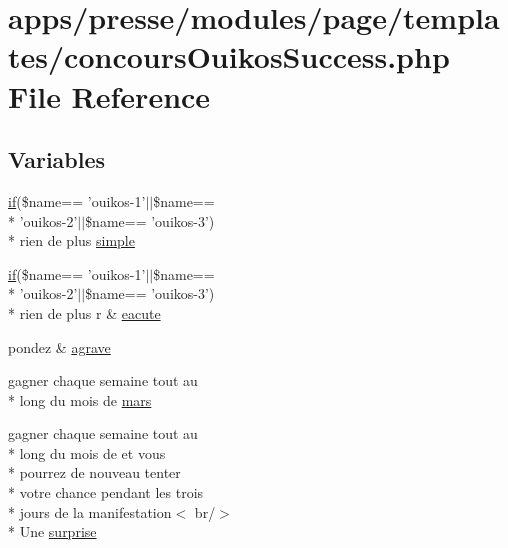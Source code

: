 \hypertarget{presse_2modules_2page_2templates_2concours_ouikos_success_8php}{\section{apps/presse/modules/page/templates/concours\-Ouikos\-Success.php File Reference}
\label{presse_2modules_2page_2templates_2concours_ouikos_success_8php}
}
\subsection*{Variables}
\begin{DoxyCompactItemize}
\item 
\hyperlink{live_2modules_2tournament_2templates_2__form_team_8php_ae30a307b320d8da5d9a945eaf68f7549}{if}(\$name== 'ouikos-\/1'$|$$|$\$name== \\*
'ouikos-\/2'$|$$|$\$name== 'ouikos-\/3') \\*
rien de plus \hyperlink{presse_2modules_2page_2templates_2concours_ouikos_success_8php_acf9918059e86404da5434fe38d192d62}{simple}
\item 
\hyperlink{live_2modules_2tournament_2templates_2__form_team_8php_ae30a307b320d8da5d9a945eaf68f7549}{if}(\$name== 'ouikos-\/1'$|$$|$\$name== \\*
'ouikos-\/2'$|$$|$\$name== 'ouikos-\/3') \\*
rien de plus r \& \hyperlink{presse_2modules_2page_2templates_2concours_ouikos_success_8php_a5c9a34c76cebfd8ae481fa185a4530af}{eacute}
\item 
pondez \& \hyperlink{presse_2modules_2page_2templates_2concours_ouikos_success_8php_adcbedde811e3c81b65c252edf38caea2}{agrave}
\item 
gagner chaque semaine tout au \\*
long du mois de \hyperlink{presse_2modules_2page_2templates_2concours_ouikos_success_8php_a750c51d77a2a60f666d47fce2c5fa35b}{mars}
\item 
gagner chaque semaine tout au \\*
long du mois de et vous \\*
pourrez de nouveau tenter \\*
votre chance pendant les trois \\*
jours de la manifestation$<$ br/$>$\\*
 Une \hyperlink{presse_2modules_2page_2templates_2concours_ouikos_success_8php_a1904ff8bd57e228d157eeb2bea88cacf}{surprise}

\end{DoxyCompactItemize}

